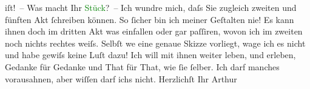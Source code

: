                     iſt! –\pend
           \pstart
           Was macht Ihr \textcolor{green}{Stück}{}? – Ich wundre mich, daſs
                    Sie zugleich zweiten und fünften Akt ſchreiben können. So ſicher bin ich meiner
                    Geſtalten nie! Es kann ihnen doch im dritten Akt {\pb}was einfallen oder gar paſſiren, wovon ich im zweiten noch nichts rechtes
                    weiſs. Selbſt we{\geminationn} eine genaue Skizze vorliegt, wage
                    ich es nicht und habe gewiſs keine Luſt dazu! Ich will mit ihnen weiter leben,
                    und erleben, Gedanke für Gedanke und That für That, wie ſie ſelber. Ich darf
                    manches vorausahnen, aber wiſſen darf ichs nicht.\pend
           \pstart Herzlichſt Ihr \spacefill\mbox{Arthur}\pend{}\endnumbering{}  
      